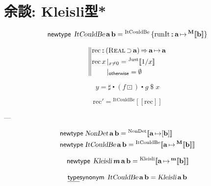 \documentclass[a5paper,twoside,fleqn,draft]{jsbook}
\def\[{[\![}
\def\]{]\!]}
\newcommand{\mBrace}{\Vert}
\newcommand{\mKeyword}[1]{\mathsf{#1}}
\newcommand{\mKeywordUnderline}[1]{\text{\underline{\textsf{#1}}}}
\newcommand{\mNewTypeDeclKeyword}{\mKeyword{newtype}}
\newcommand{\mOtherwiseKeyword}{\mKeyword{otherwise}}
\newcommand{\mTypeSynonymDeclKeyword}{\mKeywordUnderline{type}\mKeyword{synonym}}
\DeclareMathOperator{\mNewTypeDecl}{\mNewTypeDeclKeyword}
\DeclareMathOperator{\mOtherwise}{\mOtherwiseKeyword}
\DeclareMathOperator{\mSuperClass}{\Rightarrow}
\DeclareMathOperator{\mSuperSet}{\supset}
\DeclareMathOperator{\mTypeSynonymDecl}{\mTypeSynonymDeclKeyword}
\newcommand{\mNothing}{\emptyset}
\DeclareMathOperator{\mApply}{\$}
\DeclareMathOperator{\mComp}{\centerdot}
\DeclareMathOperator{\mFuncArrow}{\mapsto}
\DeclareMathOperator{\mIn}{{:\!:}}
\DeclareMathOperator{\mMapMaybe}{\boxdot}
\newcommand{\mType}[1]{\mathbf{#1}} %
\newcommand{\mPolymorphicTypeParameter}[1]{\textbf{\textit{#1}}}
\newcommand{\mA}{\mType{a}}
\newcommand{\mB}{\mType{b}}
\newcommand{\mTypeAssemble}[2]{{}^\mType{#1}\[\mType{#2}\]}
\newcommand{\mMaybeType}[1]{\mTypeAssemble{M}{#1}}
\newcommand{\mTypeConstructor}[1]{\textsl{#1}}
\newcommand{\mValueConstructor}[1]{\mathrm{#1}}
\newcommand{\mValueWith}[2]{{}^\mValueConstructor{#1}\[#2\]}
\newcommand{\mValueRecordBeginWith}[1]{{}^\mValueConstructor{#1}\,\{}
\newcommand{\mValueRecordEnd}{\}}
\newcommand{\mValueRecordWith}[2]{\mValueRecordBeginWith{#1}{#2}\mValueRecordEnd}
\newcommand{\mJustWith}[1]{\mValueWith{Just}{#1}}
\newcommand{\mTypeClass}[1]{\textsc{#1}} %
\newcommand{\mRealTypeClass}{\mTypeClass{Real}}
\newcommand{\mGuard}[1]{\mathop{\mid_{#1}}}
\begin{document}
\section{余談: Kleisli型*}

\begin{equation}
  \mNewTypeDecl\;
  \mTypeConstructor{ItCouldBe}\,\mA\,\mB
  =\mValueRecordWith{ItCouldBe}{\mathrm{runIt}\mIn\mA\mFuncArrow\mMaybeType{b}}
\end{equation}

\begin{equation}
  \left\mBrace
  \begin{aligned}
    &\mathrm{rec}
    \mIn{}(\mRealTypeClass\mSuperSet\mA)
    \mSuperClass\mA\mFuncArrow\mA\\
    &
    \begin{aligned}
      \mathop{\mathrm{rec}}x&\mGuard{x\neq0}
      =\mJustWith{1/x}\\
      &\mGuard{\mOtherwise}
      =\mNothing
    \end{aligned}
  \end{aligned}
  \right.
\end{equation}

\begin{equation}
  y
  =\sharp\mComp(f\mMapMaybe)\mComp g\mApply x
\end{equation}

\begin{equation}
  \mathrm{rec}'
  =\mValueWith{ItCouldBe}{\mathrm{rec}}
\end{equation}

---

\begin{align}
  \mNewTypeDecl\;
  &\mTypeConstructor{NonDet}\,\mA\,\mB
  =\mValueWith{NonDet}{\mA\mFuncArrow[\mB]}\\
  \mNewTypeDecl\;
  &\mTypeConstructor{ItCouldBe}\,\mA\,\mB
  =\mValueWith{ItCouldBe}{\mA\mFuncArrow\mMaybeType{b}}
\end{align}

\begin{equation}
  \mNewTypeDecl\;
  \mTypeConstructor{Kleisli}\,\mPolymorphicTypeParameter{m}\,\mA\,\mB
  =\mValueWith{Kleisli}{\mA\mFuncArrow\mTypeAssemble{m}{\mB}}
\end{equation}

\begin{equation}
  \mTypeSynonymDecl\;
  \mTypeConstructor{ItCouldBe}\,\mA\,\mB
  =\mTypeConstructor{Kleisli}\,\mA\,\mB
\end{equation}
\end{document}
